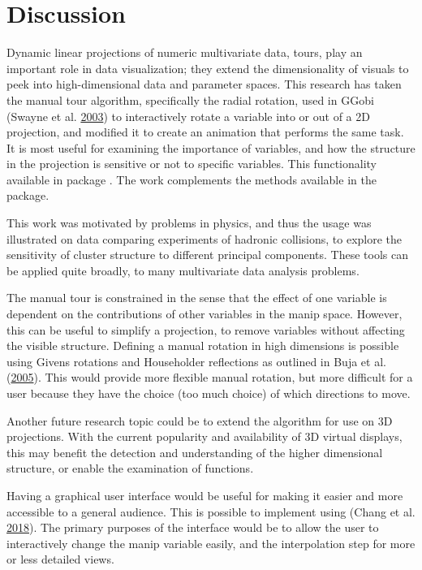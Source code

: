 \hypertarget{sec:discussion}{%
\section{Discussion}\label{sec:discussion}}

Dynamic linear projections of numeric multivariate data, tours, play an
important role in data visualization; they extend the dimensionality of
visuals to peek into high-dimensional data and parameter spaces. This
research has taken the manual tour algorithm, specifically the radial
rotation, used in GGobi (Swayne et al.
\protect\hyperlink{ref-swayne_ggobi:_2003}{2003}) to interactively
rotate a variable into or out of a 2D projection, and modified it to
create an animation that performs the same task. It is most useful for
examining the importance of variables, and how the structure in the
projection is sensitive or not to specific variables. This functionality
available in package . The work complements the methods
available in the  package.

This work was motivated by problems in physics, and thus the usage was
illustrated on data comparing experiments of hadronic collisions, to
explore the sensitivity of cluster structure to different principal
components. These tools can be applied quite broadly, to many
multivariate data analysis problems.

The manual tour is constrained in the sense that the effect of one
variable is dependent on the contributions of other variables in the
manip space. However, this can be useful to simplify a projection, to
remove variables without affecting the visible structure. Defining a
manual rotation in high dimensions is possible using Givens rotations
and Householder reflections as outlined in Buja et al.
(\protect\hyperlink{ref-buja_computational_2005}{2005}). This would
provide more flexible manual rotation, but more difficult for a user
because they have the choice (too much choice) of which directions to
move.

Another future research topic could be to extend the algorithm for use
on 3D projections. With the current popularity and availability of 3D
virtual displays, this may benefit the detection and understanding of
the higher dimensional structure, or enable the examination of
functions.

Having a graphical user interface would be useful for making it easier
and more accessible to a general audience. This is possible to implement
using  (Chang et al.
\protect\hyperlink{ref-chang_shiny:_2018}{2018}). The primary purposes
of the interface would be to allow the user to interactively change the
manip variable easily, and the interpolation step for more or less
detailed views.

